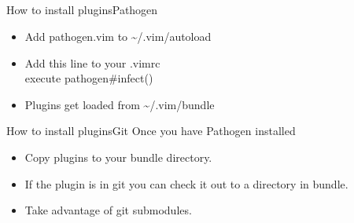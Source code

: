 \documentclass{beamer}
\begin{document}
    \subsection{}
    \begin{frame}{How to install plugins}{Pathogen}
        \begin{itemize}
            \item Add pathogen.vim to \textasciitilde/.vim/autoload
            \item Add this line to your .vimrc\\
                \quad execute pathogen\#infect()
            \item Plugins get loaded from \textasciitilde/.vim/bundle
        \end{itemize}
    \end{frame}
    \begin{frame}{How to install plugins}{Git}
        Once you have Pathogen installed
        \begin{itemize}
            \item Copy plugins to your bundle directory.
            \item If the plugin is in git you can check it out to a directory in bundle.
            \item Take advantage of git submodules.
        \end{itemize}
    \end{frame}
\end{document}
